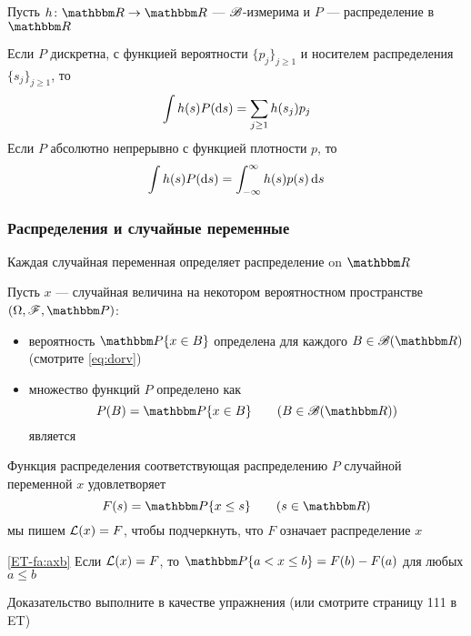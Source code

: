 \begin{frame}

    \vspace{2em}
    \Fact
    Пусть $h \colon \RR \to \RR$ --- $\mathscr B$-измерима и $P$ ---
    распределение в $\RR$
    
    Если $P$
    дискретна, с функцией вероятности $\{p_j\}_{j \geq 1}$ и носителем распределения
    $\{s_j\}_{j \geq 1}$, то
    \begin{equation*}
        \label{eq:hasp}
        \int h(s) P(\mathop{}\!\mathrm{d} s) = \sum_{j\geq 1} h(s_j) p_j 
    \end{equation*}
    Если $P$ абсолютно непрерывно с функцией плотности $p$, то
    \begin{equation*}
        \label{eq:hasd}
        \int h(s)P(\mathop{}\!\mathrm{d} s) = \int_{-\infty}^{\infty} h(s) p(s) \mathop{}\!\mathrm{d} s
    \end{equation*}
\end{frame}


\begin{frame}\frametitle{Распределения и случайные переменные}

    \vspace{2em}
    Каждая случайная переменная 
    определяет распределение on $\RR$ 
    
    \vspace{.7em}
    Пусть $x$ --- случайная величина на некотором вероятностном пространстве $(\Omega,\fF, \PP)$:
    \begin{itemize}
        \item  вероятность $\PP\{x \in B\}$ определена
        для каждого $B \in \bB(\RR)$ (смотрите \eqref{eq:dorv})
        \item  множество функций $P$ определено как
            \begin{equation}
                \label{eq:pidox}
                P(B) = \PP\{x \in B\} 
                \qquad (B \in \bB(\RR))
            \end{equation}
            является 
    \end{itemize}
    
\end{frame}

\begin{frame}

    \vspace{2em}
     Функция распределения соответствующая распределению $P$ случайной переменной $x$ 
     удовлетворяет
    \begin{equation}
        \label{eq:deffx}
        F(s) = \PP \{x \leq s\}
        \qquad (s \in \RR)
    \end{equation}
    мы пишем $\mathcal L(x) = F$, чтобы подчеркнуть, что $F$ означает распределение $x$
    
    \vspace{.7em}
    \Fact\eqref{ET-fa:axb}
    Если $\mathcal L(x)= F$, то $\PP\{a < x \leq b\} = F(b) - F(a)$ для любых $a \leq b$
    
    Доказательство выполните в качестве упражнения (или смотрите страницу 111 в ET) 
    
\end{frame}

